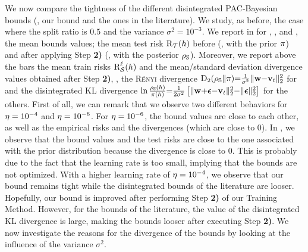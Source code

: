 We now compare the tightness of the different disintegrated PAC-Bayesian bounds (\ie, our bound and the ones in the literature). 
We study, as before, the case where the split ratio is $0.5$ and the variance $\sigma^2=10^{-3}$.
We report in  for \algoours, \algorivasplata, \algoblanchard and \algocatoni, the mean bounds values; the mean test risk $\Risk_{\dT}(\h)$ before (\ie, with the prior $\P$) and after applying Step {\bf 2)} (\ie, with the posterior $\AQ$).
Moreover, we report above the bars the mean train risks $\RiskLoss_{\dS}(\h)$ and the mean/standard deviation divergence values obtained after Step {\bf 2)}, \ie, the \textsc{Rényi} divergence $\Renyi_{2}(\AQ\|\P){=}\tfrac{1}{\sigma^2}\|\wbf{-}\vbf_\t\|_{2}^{2}$ for \algoours and the disintegrated KL divergence $\ln\frac{\AQ(\h)}{\P(\h)}{=}\tfrac{1}{2\sigma^2}\left[\| \wbf{+}\epsilonbf{-}\vbf_\t\|^2_{2} {-}\|\epsilonbf\|^2_{2}\right]$ for the others.
First of all, we can remark that we observe two different behaviors for $\lr=10^{-4}$ and $\lr=10^{-6}$. 
For $\lr=10^{-6}$, the bound values are close to each other, as well as the empirical risks and the divergences (which are close to $0$).
In , we observe that the bound values and the test risks are close to the one associated with the prior distribution because the divergence is close to $0$.
This is probably due to the fact that the learning rate is too small, implying that the bounds are not optimized.
With a higher learning rate of $\lr=10^{-4}$, we observe that our bound remains tight while the disintegrated bounds of the literature are looser.
Hopefully, our bound is improved after performing Step {\bf 2)} of our Training Method.
However, for the bounds of the literature, the value of the disintegrated KL divergence is large, making the bounds looser after executing Step {\bf 2)}.
We now investigate the reasons for the divergence of the bounds
by looking at the influence of the variance $\sigma^2$.

